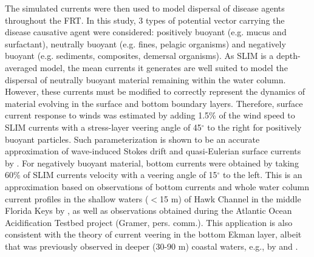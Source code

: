 \documentclass[utf8]{frontiersSCNS}
\begin{document}
The simulated currents were then used to model dispersal of disease agents throughout the FRT. In this study, 3 types of potential vector carrying the disease causative agent were considered: positively buoyant (e.g. mucus and surfactant), neutrally buoyant (e.g. fines, pelagic organisms) and negatively buoyant (e.g. sediments, composites, demersal organisms). As SLIM is a depth-averaged model, the mean currents it generates are well suited to model the dispersal of neutrally buoyant material remaining within the water column. However, these currents must be modified to correctly represent the dynamics of material evolving in the surface and bottom boundary layers. Therefore, surface current response to winds was estimated by adding 1.5\% of the wind speed to SLIM currents with a stress-layer veering angle of 45$^\circ$ to the right for positively buoyant particles. Such parameterization is shown to be an accurate approximation of wave-induced Stokes drift and quasi-Eulerian surface currents by \cite{ardhuin2009observation}. For negatively buoyant material, bottom currents were obtained by taking 60\% of SLIM currents velocity with a veering angle of 15$^\circ$ to the left. This is an approximation based on observations of bottom currents and whole water column current profiles in the shallow waters ($<$15 m) of Hawk Channel in the middle Florida Keys by \cite{smith2009influence}, as well as observations obtained during the Atlantic Ocean Acidification Testbed project (Gramer, pers. comm.). This application is also consistent with the theory of current veering in the bottom Ekman layer, albeit that was previously observed in deeper (30-90 m) coastal waters, e.g., by \cite{perlin2007organization} and \cite{kundu1976ekman}.
\end{document}
